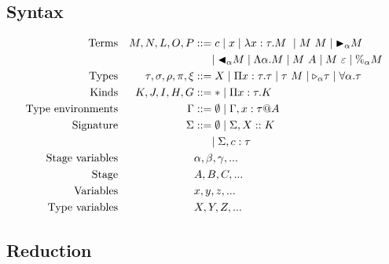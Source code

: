 \subsection{Syntax}

\begin{align*}
  \textrm{Terms}             &  & M,N,L,O,P                & ::= c \mid x \mid \lambda x:\tau.M\ \mid M\ M \mid \TB_\alpha M                                \\
                             &  &                          & \ \ \ \ \mid \TBL_\alpha M \mid \Lambda\alpha.M \mid M\ A \mid M\ \varepsilon \mid \%_\alpha M \\
  \textrm{Types}             &  & \tau,\sigma,\rho,\pi,\xi & ::= X \mid \Pi x:\tau.\tau \mid \tau\ M \mid \TW_{\alpha} \tau \mid \F\alpha.\tau                 \\
  \textrm{Kinds}             &  & K,J,I,H,G                & ::= * \mid \Pi x:\tau.K                                                                        \\
  \textrm{Type environments} &  & \Gamma                   & ::= \emptyset \mid \Gamma,x:\tau@A                                                             \\
  \textrm{Signature}         &  & \Sigma                   & ::= \emptyset \mid \Sigma,X::K                                                                 \\
                             &  &                          & \ \ \ \ \mid \Sigma,c:\tau                                                                     \\
  \textrm{Stage variables}   &  &                          & \alpha,\beta,\gamma,...                                                                        \\
  \textrm{Stage}             &  &                          & A,B,C,...                                                                                      \\
  \textrm{Variables}         &  &                          & x,y,z,...                                                                                      \\
  \textrm{Type variables}    &  &                          & X,Y,Z,...                                                                                      \\
\end{align*}

\subsection{Reduction}

